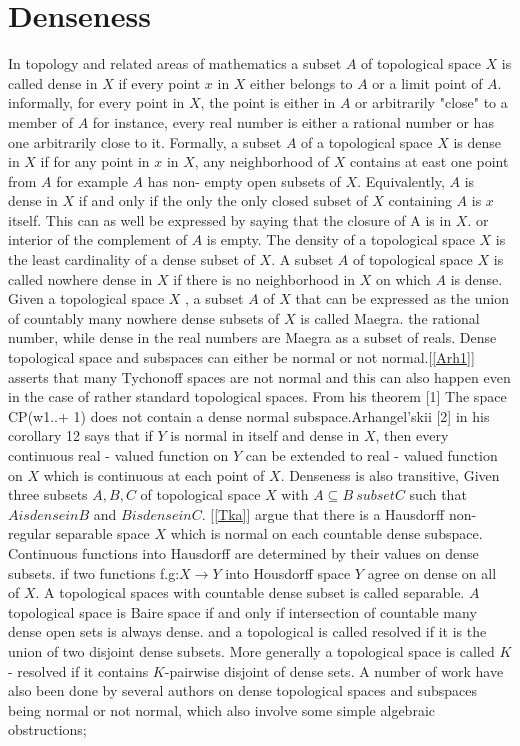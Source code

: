 \documentclass[PhD,14,a4paper]{report}
\theoremstyle{plain}
\theoremstyle{definition}
\theoremstyle{remark}
\numberwithin{figure}{section}
\numberwithin{equation}{subsection}
\begin{document}
{ \section{Denseness}
In topology and related areas of mathematics a subset $A$ of topological space $X$ is called dense  in $X$  if every point $x$ in $X$ either belongs to $A$ or a limit point of $A$. informally, for every point in $X$, the point is either in $A$ or arbitrarily "close" to a member of $A$ for instance, every real number is either a rational number or has one arbitrarily close to it. Formally, a subset $A$ of a topological space $X$ is dense in $X$ if for any point in $x$ in $X$, any neighborhood of $X$ contains at east one point from $A$ for example $A$ has non- empty open subsets of $X$. Equivalently, $A$ is dense in $X$ if and only if the only the only closed subset of $X$ containing $A$ is $x$ itself. This can as well be expressed by saying that the closure of A is in $X$. or interior of the complement of $A$ is empty. The density of a topological space $X$ is the least cardinality of a dense subset of $X$. A subset $A$ of topological space $X$ is called nowhere dense in $X$ if there is no neighborhood in $X$ on which $A$ is dense. Given a topological space $X$ , a subset $A$ of $X$ that can be expressed as the union of countably many nowhere dense subsets of $X$ is called Maegra. the rational number, while dense in the  real numbers are Maegra as a subset of reals. Dense topological space and subspaces can either be normal or not normal.[\ref{Arh1}] asserts that many Tychonoff spaces are not normal and this can also happen even in the case of rather standard  topological spaces. From his theorem [1] The space CP(w1..+ 1) does not contain a dense normal subspace.Arhangel'skii [2] in his corollary 12 says that if $Y$ is normal in itself and dense in $X$, then every continuous real - valued function on $Y$ can be extended to real - valued function on $X$ which is continuous at each point of $X$. Denseness is also transitive, Given three subsets $A, B, C$ of topological space $X$ with $A\subseteq B\ subset C$ such that $A is dense in B$ and $B is dense in C$. [\ref{Tka}] argue that there is a Hausdorff non-regular separable space $X$ which is normal on each countable dense subspace. Continuous functions into Hausdorff are determined by their values on dense subsets. if two functions f.g:$X\rightarrow Y$ into Housdorff space $Y$ agree on dense on all of $X$. A topological spaces with countable dense subset is called separable. $A$ topological space is Baire space if and only if intersection of countable many dense open sets is always dense. and a topological is called resolved if it is the union of two disjoint dense subsets. More generally a topological space is called $K$- resolved if it contains $K$-pairwise disjoint of dense sets. A number of work have also been done by several authors on dense topological spaces and subspaces being normal or not normal, which also involve some simple algebraic obstructions;

}
\end{document}
